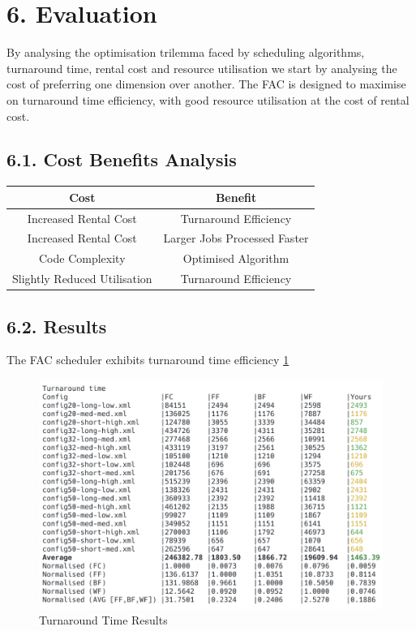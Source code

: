 \documentclass[a4paper]{article} %
\begin{document}
\section*{6. Evaluation}

By analysing the optimisation trilemma faced by scheduling algorithms, turnaround time, rental cost and resource utilisation we start by analysing the cost of preferring one dimension over another. The FAC is designed to maximise on turnaround time efficiency, with good resource utilisation at the cost of rental cost.

\subsection*{6.1. Cost Benefits Analysis}
\begin{center}
\begin{tabular}{||c c||} 
 \hline
 Cost & Benefit \\ [0.5ex] 
 \hline\hline
  Increased Rental Cost & Turnaround Efficiency \\ [1ex]
 \hline
Increased Rental Cost & Larger Jobs Processed Faster  \\ [1ex]
 \hline
Code Complexity & Optimised Algorithm \\ [1ex]
 \hline
 Slightly Reduced Utilisation & Turnaround Efficiency  \\ [1ex]
 \hline
\end{tabular}
\end{center}

\subsection*{6.2. Results}
The FAC scheduler exhibits turnaround time efficiency \ref{results}
\begin{figure}[H]
    \centering
    \includegraphics[scale=0.5]{images/turnaround.png}
    \caption{Turnaround Time Results}
    \label{results}
\end{figure}
\end{document}
